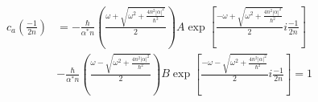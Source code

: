 \begin{align*}
    c_a(\frac{-1}{2n}) & =
    -\frac{\hbar}{\alpha^* n }\left(\frac{\omega + \sqrt{\omega^2 + \frac{4n^2|\alpha|^2}{\hbar^2}}}{2} \right)A\exp\left[
                                                                                                                        \frac{-\omega + \sqrt{\omega^2 + \frac{4n^2|\alpha|^2}{\hbar^2}}}{2} i\frac{-1}{2n}
                                                                                                                        \right] \\
                       & -
    \frac{\hbar}{\alpha^* n }\left( \frac{\omega -\sqrt{\omega^2 + \frac{4n^2|\alpha|^2}{\hbar^2}}}{2}\right) B\exp\left[
                                                                                                                       \frac{-\omega -\sqrt{\omega^2 + \frac{4n^2|\alpha|^2}{\hbar^2}}}{2}i\frac{-1}{2n}
                                                                                                                       \right] = 1
\end{align*}
